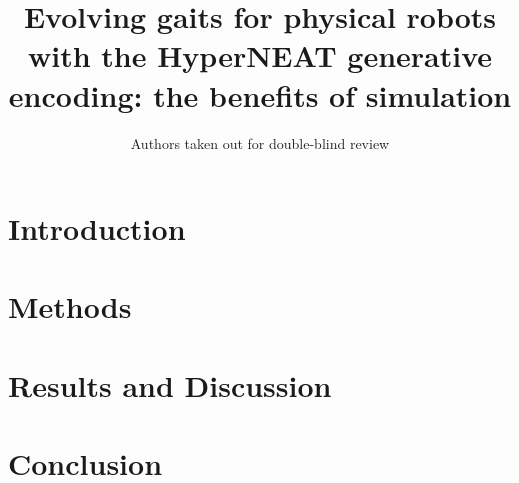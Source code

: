 \documentclass{llncs}
\begin{document}
%
\title{Evolving gaits for physical robots with the HyperNEAT generative encoding: the benefits of simulation}

\author{Authors taken out for double-blind review}

\maketitle
%
%
%
%
\begin{abstract}

\end{abstract}
%
%


\section{Introduction}

%
%
\section{Methods}








%
%
\section{Results and Discussion}

%
%
\section{Conclusion}

%
%

%
\footnotesize


%
%
\end{document}

